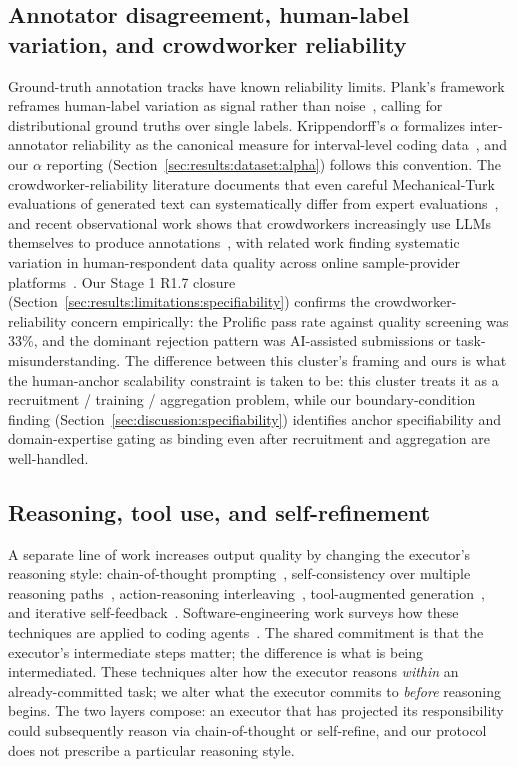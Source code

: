 \subsection{Annotator disagreement, human-label variation, and crowdworker reliability}
\label{sec:related:annotator}

Ground-truth annotation tracks have known reliability limits. Plank's framework reframes human-label variation as signal rather than noise~\cite{plank2022humanlabel}, calling for distributional ground truths over single labels. Krippendorff's $\alpha$ formalizes inter-annotator reliability as the canonical measure for interval-level coding data~\cite{krippendorff2011alpha, hayes2007standard}, and our $\alpha$ reporting (Section~\ref{sec:results:dataset:alpha}) follows this convention. The crowdworker-reliability literature documents that even careful Mechanical-Turk evaluations of generated text can systematically differ from expert evaluations~\cite{karpinska2021turkperils, clark2021allthatsgold}, and recent observational work shows that crowdworkers increasingly use LLMs themselves to produce annotations~\cite{veselovsky2023crowdai}, with related work finding systematic variation in human-respondent data quality across online sample-provider platforms~\cite{frenkenberg2025aiagentprev}. Our Stage 1 R1.7 closure (Section~\ref{sec:results:limitations:specifiability}) confirms the crowdworker-reliability concern empirically: the Prolific pass rate against quality screening was 33\%, and the dominant rejection pattern was AI-assisted submissions or task-misunderstanding. The difference between this cluster's framing and ours is what the human-anchor scalability constraint is taken to be: this cluster treats it as a recruitment / training / aggregation problem, while our boundary-condition finding (Section~\ref{sec:discussion:specifiability}) identifies anchor specifiability and domain-expertise gating as binding even after recruitment and aggregation are well-handled.

\subsection{Reasoning, tool use, and self-refinement}
\label{sec:related:reasoning}

A separate line of work increases output quality by changing the executor's reasoning style: chain-of-thought prompting~\cite{wei2022cot}, self-consistency over multiple reasoning paths~\cite{wang2023selfconsistency}, action-reasoning interleaving~\cite{yao2023react}, tool-augmented generation~\cite{schick2023toolformer}, and iterative self-feedback~\cite{madaan2023selfrefine}. Software-engineering work surveys how these techniques are applied to coding agents~\cite{hou2024llm4se}. The shared commitment is that the executor's intermediate steps matter; the difference is what is being intermediated. These techniques alter how the executor reasons \emph{within} an already-committed task; we alter what the executor commits to \emph{before} reasoning begins. The two layers compose: an executor that has projected its responsibility could subsequently reason via chain-of-thought or self-refine, and our protocol does not prescribe a particular reasoning style.


